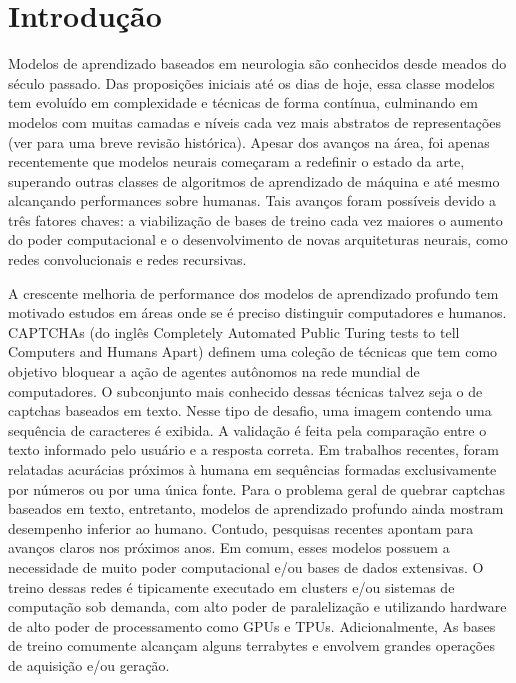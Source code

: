 \chapter{Introdução}

Modelos de aprendizado baseados em neurologia são conhecidos desde meados do século passado\cite{perceptron_58}. Das proposições iniciais até os dias de hoje, essa classe modelos tem evoluído em complexidade e técnicas de forma contínua,
culminando em modelos com muitas camadas e níveis cada vez mais abstratos de representações (ver \cite{Goodfellow-et-al-2016} para uma breve revisão histórica).
Apesar dos avanços na área, foi apenas recentemente que modelos neurais 
começaram a redefinir o estado da arte, superando outras classes de algoritmos de aprendizado de máquina\cite{imagenet_2012}
e até mesmo alcançando performances sobre humanas\cite{mnih2015humanlevel}.
Tais avanços foram possíveis devido a três fatores chaves: a viabilização de bases de treino
cada vez maiores o aumento do poder computacional e o desenvolvimento de novas arquiteturas neurais, como redes convolucionais e redes recursivas.

A crescente melhoria de performance dos modelos de aprendizado profundo tem motivado
estudos em áreas onde se é preciso distinguir computadores e humanos. CAPTCHAs \cite{captcha_2003} (do inglês Completely
Automated  Public  Turing  tests  to  tell  Computers  and
Humans Apart) definem uma coleção de técnicas que tem como objetivo bloquear a 
ação de agentes autônomos na rede mundial de computadores. O subconjunto mais conhecido dessas técnicas talvez seja o de captchas baseados em texto\cite{captcha_review_2017}. 
Nesse tipo de desafio, uma imagem contendo uma sequência de caracteres é exibida.
A validação é feita pela comparação entre o texto informado pelo usuário e a resposta
correta. Em trabalhos recentes, foram relatadas acurácias próximos à humana em sequências formadas exclusivamente por números\cite{captcha_break_2013} ou por uma única fonte\cite{captcha_break_2017}. Para o problema geral de 
quebrar captchas baseados em texto, entretanto, modelos de aprendizado profundo ainda mostram
desempenho inferior ao humano. Contudo, pesquisas recentes apontam para avanços claros nos próximos anos\cite{Bursztein2014TheEI}. Em comum, esses modelos possuem a 
necessidade de muito poder computacional e/ou bases de dados extensivas.
O treino dessas redes é tipicamente executado em clusters e/ou sistemas de computação sob demanda, com alto poder de paralelização e utilizando hardware de alto poder de processamento como GPUs e TPUs. Adicionalmente, As bases de treino comumente alcançam alguns terrabytes e envolvem grandes operações de aquisição e/ou geração.

